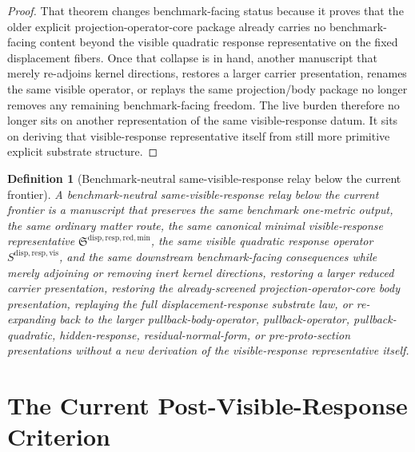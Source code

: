 \documentclass[11pt]{article}
\newcommand{\MinimalReducedStructure}{\mathfrak S^{\mathrm{disp,resp,red,min}}}
\newcommand{\VisibleResponseOperator}{S^{\mathrm{disp,resp,vis}}}
\newtheorem{definition}{Definition}
\begin{document}
\begin{proof}
That theorem changes benchmark-facing status because it proves that the older explicit projection-operator-core package already carries no benchmark-facing content beyond the visible quadratic response representative on the fixed displacement fibers. Once that collapse is in hand, another manuscript that merely re-adjoins kernel directions, restores a larger carrier presentation, renames the same visible operator, or replays the same projection/body package no longer removes any remaining benchmark-facing freedom. The live burden therefore no longer sits on another representation of the same visible-response datum. It sits on deriving that visible-response representative itself from still more primitive explicit substrate structure.
\end{proof}

\begin{definition}[Benchmark-neutral same-visible-response relay below the current frontier]
A \emph{benchmark-neutral same-visible-response relay below the current frontier} is a manuscript that preserves the same benchmark one-metric output, the same ordinary matter route, the same canonical minimal visible-response representative \(\MinimalReducedStructure\), the same visible quadratic response operator \(\VisibleResponseOperator\), and the same downstream benchmark-facing consequences while merely adjoining or removing inert kernel directions, restoring a larger reduced carrier presentation, restoring the already-screened projection-operator-core body presentation, replaying the full displacement-response substrate law, or re-expanding back to the larger pullback-body-operator, pullback-operator, pullback-quadratic, hidden-response, residual-normal-form, or pre-proto-section presentations without a new derivation of the visible-response representative itself.
\end{definition}

\section{The Current Post-Visible-Response Criterion}
\end{document}

